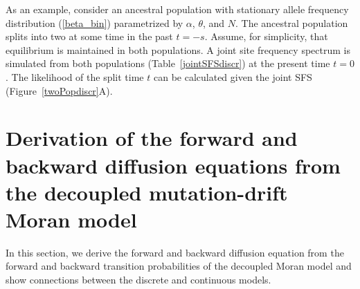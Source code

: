 \documentclass[preprint]{elsarticle}
\begin{document}

As an example, consider an ancestral population with stationary allele frequency distribution (\ref{beta_bin}) parametrized by $\alpha$, $\theta$, and $N$. The ancestral population splits into two at some time in the past $t=-s$. Assume, for simplicity, that equilibrium is maintained in both populations. A joint site frequency spectrum is simulated from both populations (Table~\ref{jointSFSdiscr}) at the present time $t=0$. The likelihood of the split time $t$ can be calculated given the joint SFS (Figure~\ref{twoPopdiscr}A).


\section{Derivation of the forward and backward diffusion equations from the decoupled mutation-drift Moran model}

In this section, we derive the forward and backward diffusion equation from the forward and backward transition probabilities of the decoupled Moran model and show connections between the discrete and continuous models.
\end{document}
